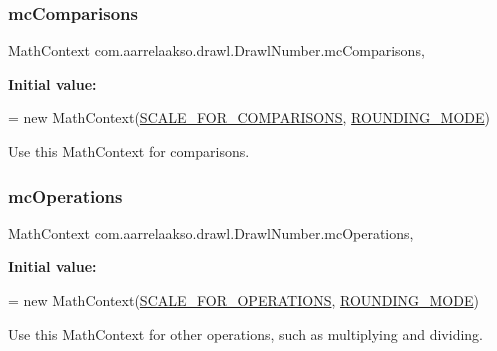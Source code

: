 \subsubsection{\texorpdfstring{mc\+Comparisons}{mcComparisons}}
{\footnotesize\ttfamily Math\+Context com.\+aarrelaakso.\+drawl.\+Drawl\+Number.\+mc\+Comparisons\hspace{0.3cm}{\ttfamily [static]}, {\ttfamily [protected]}}

{\bfseries Initial value\+:}
\begin{DoxyCode}
= \textcolor{keyword}{new} MathContext(\hyperlink{classcom_1_1aarrelaakso_1_1drawl_1_1_drawl_number_ace1cb62d1ecce8212578d1a13cf5cbc4}{SCALE\_FOR\_COMPARISONS},
            \hyperlink{classcom_1_1aarrelaakso_1_1drawl_1_1_drawl_number_ab4b44bb0675da90d8f435286911b711e}{ROUNDING\_MODE})
\end{DoxyCode}


Use this Math\+Context for comparisons. 

\mbox{\label{classcom_1_1aarrelaakso_1_1drawl_1_1_drawl_number_a75a2442ef7cdcfb4dca9aba870ee7108}} 
\subsubsection{\texorpdfstring{mc\+Operations}{mcOperations}}
{\footnotesize\ttfamily Math\+Context com.\+aarrelaakso.\+drawl.\+Drawl\+Number.\+mc\+Operations\hspace{0.3cm}{\ttfamily [static]}, {\ttfamily [protected]}}

{\bfseries Initial value\+:}
\begin{DoxyCode}
= \textcolor{keyword}{new} MathContext(\hyperlink{classcom_1_1aarrelaakso_1_1drawl_1_1_drawl_number_ab9bb5bf4986830f56f01cb218ba637ce}{SCALE\_FOR\_OPERATIONS},
            \hyperlink{classcom_1_1aarrelaakso_1_1drawl_1_1_drawl_number_ab4b44bb0675da90d8f435286911b711e}{ROUNDING\_MODE})
\end{DoxyCode}


Use this Math\+Context for other operations, such as multiplying and dividing. 

\mbox{\label{classcom_1_1aarrelaakso_1_1drawl_1_1_drawl_number_a9fe9f40163a4f5581b35d61ecf63f278}} 
